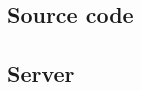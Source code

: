 \documentclass[11pt, a4paper]{article}
\begin{document}
\begin{appendices}
\section{Source code}
\subsection{Server} %











\end{appendices}
\end{document}

